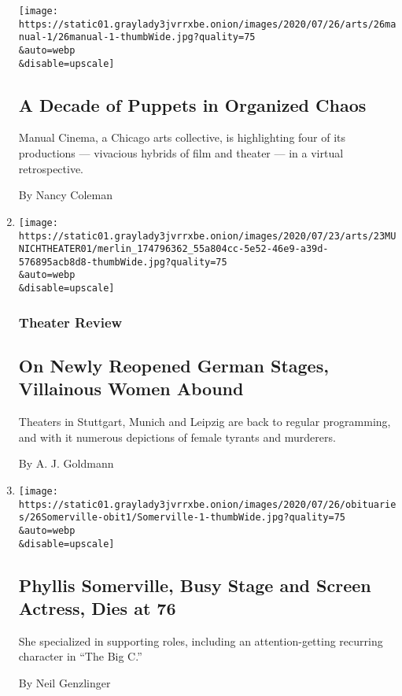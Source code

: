 \begin{enumerate}
  \texttt{[image: https://static01.graylady3jvrrxbe.onion/images/2020/07/26/arts/26manual-1/26manual-1-thumbWide.jpg?quality=75\\\&auto=webp\\\&disable=upscale]}

  \hypertarget{a-decade-of-puppets-in-organized-chaos}{%
  \subsection{A Decade of Puppets in Organized
  Chaos}\label{a-decade-of-puppets-in-organized-chaos}}

  Manual Cinema, a Chicago arts collective, is highlighting four of its
  productions --- vivacious hybrids of film and theater --- in a virtual
  retrospective.

  By Nancy Coleman
\item
  \href{/2020/07/23/theater/german-theater-post-lockdown.html}{}

  \texttt{[image: https://static01.graylady3jvrrxbe.onion/images/2020/07/23/arts/23MUNICHTHEATER01/merlin\_174796362\_55a804cc-5e52-46e9-a39d-576895acb8d8-thumbWide.jpg?quality=75\\\&auto=webp\\\&disable=upscale]}

  \hypertarget{theater-review}{%
  \subsubsection{Theater Review}\label{theater-review}}

  \hypertarget{on-newly-reopened-german-stages-villainous-women-abound}{%
  \subsection{On Newly Reopened German Stages, Villainous Women
  Abound}\label{on-newly-reopened-german-stages-villainous-women-abound}}

  Theaters in Stuttgart, Munich and Leipzig are back to regular
  programming, and with it numerous depictions of female tyrants and
  murderers.

  By A. J. Goldmann
\item
  \href{/2020/07/22/arts/television/phyllis-somerville-dead.html}{}

  \texttt{[image: https://static01.graylady3jvrrxbe.onion/images/2020/07/26/obituaries/26Somerville-obit1/Somerville-1-thumbWide.jpg?quality=75\\\&auto=webp\\\&disable=upscale]}

  \hypertarget{phyllis-somerville-busy-stage-and-screen-actress-dies-at-76}{%
  \subsection{Phyllis Somerville, Busy Stage and Screen Actress, Dies at
  76}\label{phyllis-somerville-busy-stage-and-screen-actress-dies-at-76}}

  She specialized in supporting roles, including an attention-getting
  recurring character in ``The Big C.''

  By Neil Genzlinger
\end{enumerate}

